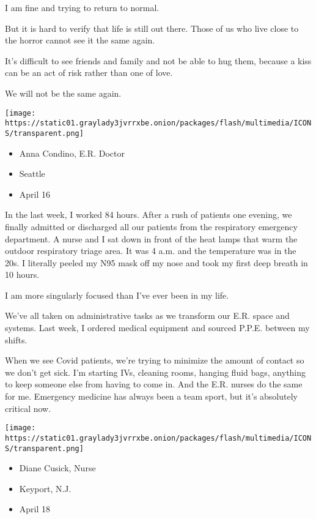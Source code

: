 I am fine and trying to return to normal.

But it is hard to verify that life is still out there. Those of us who
live close to the horror cannot see it the same again.

It's difficult to see friends and family and not be able to hug them,
because a kiss can be an act of risk rather than one of love.

We will not be the same again.

\texttt{[image: https://static01.graylady3jvrrxbe.onion/packages/flash/multimedia/ICONS/transparent.png]}

\begin{itemize}
\tightlist
\item
  Anna Condino, E.R. Doctor
\item
  Seattle
\item
  April 16
\end{itemize}

In the last week, I worked 84 hours. After a rush of patients one
evening, we finally admitted or discharged all our patients from the
respiratory emergency department. A nurse and I sat down in front of the
heat lamps that warm the outdoor respiratory triage area. It was 4 a.m.
and the temperature was in the 20s. I literally peeled my N95 mask off
my nose and took my first deep breath in 10 hours.

I am more singularly focused than I've ever been in my life.

We've all taken on administrative tasks as we transform our E.R. space
and systems. Last week, I ordered medical equipment and sourced P.P.E.
between my shifts.

When we see Covid patients, we're trying to minimize the amount of
contact so we don't get sick. I'm starting IVs, cleaning rooms, hanging
fluid bags, anything to keep someone else from having to come in. And
the E.R. nurses do the same for me. Emergency medicine has always been a
team sport, but it's absolutely critical now.

\texttt{[image: https://static01.graylady3jvrrxbe.onion/packages/flash/multimedia/ICONS/transparent.png]}

\begin{itemize}
\tightlist
\item
  Diane Cusick, Nurse
\item
  Keyport, N.J.
\item
  April 18
\end{itemize}

